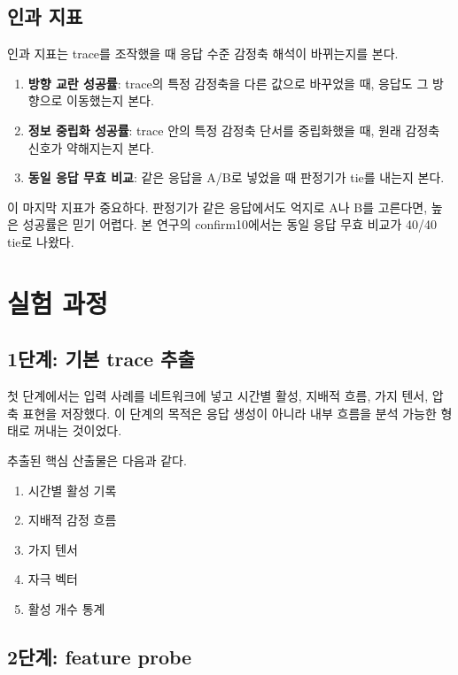 \documentclass[11pt,a4paper]{article}
\begin{document}
\subsection{인과 지표}

인과 지표는 trace를 조작했을 때 응답 수준 감정축 해석이 바뀌는지를 본다.

\begin{enumerate}
  \item \textbf{방향 교란 성공률}: trace의 특정 감정축을 다른 값으로 바꾸었을 때, 응답도 그 방향으로 이동했는지 본다.
  \item \textbf{정보 중립화 성공률}: trace 안의 특정 감정축 단서를 중립화했을 때, 원래 감정축 신호가 약해지는지 본다.
  \item \textbf{동일 응답 무효 비교}: 같은 응답을 A/B로 넣었을 때 판정기가 tie를 내는지 본다.
\end{enumerate}

이 마지막 지표가 중요하다. 판정기가 같은 응답에서도 억지로 A나 B를 고른다면, 높은 성공률은 믿기 어렵다. 본 연구의 confirm10에서는 동일 응답 무효 비교가 40/40 tie로 나왔다.

\section{실험 과정}

\subsection{1단계: 기본 trace 추출}

첫 단계에서는 입력 사례를 네트워크에 넣고 시간별 활성, 지배적 흐름, 가지 텐서, 압축 표현을 저장했다. 이 단계의 목적은 응답 생성이 아니라 내부 흐름을 분석 가능한 형태로 꺼내는 것이었다.

추출된 핵심 산출물은 다음과 같다.

\begin{enumerate}
  \item 시간별 활성 기록
  \item 지배적 감정 흐름
  \item 가지 텐서
  \item 자극 벡터
  \item 활성 개수 통계
\end{enumerate}

\subsection{2단계: feature probe}
\end{document}
